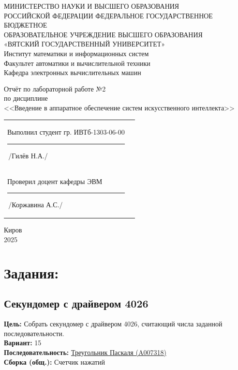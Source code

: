 \documentclass[oneside,a4paper,14pt]{extarticle} %
\begin{document}
\newpage\thispagestyle{empty}
\begin{center}
	МИНИСТЕРСТВО НАУКИ И ВЫСШЕГО ОБРАЗОВАНИЯ\\
	РОССИЙСКОЙ ФЕДЕРАЦИИ
	ФЕДЕРАЛЬНОЕ ГОСУДАРСТВЕННОЕ БЮДЖЕТНОЕ\\
	ОБРАЗОВАТЕЛЬНОЕ
	УЧРЕЖДЕНИЕ ВЫСШЕГО ОБРАЗОВАНИЯ\\
	«ВЯТСКИЙ ГОСУДАРСТВЕННЫЙ УНИВЕРСИТЕТ»\\
	Институт математики и информационных систем\\
	Факультет автоматики и вычислительной техники\\
	Кафедра электронных вычислительных машин
\end{center}
\vspace{30mm}

\begin{center}
	Отчёт по лабораторной работе №2\\
	по дисциплине\\
	<<Введение в аппаратное обеспечение систем искусственного интеллекта>>\\

\end{center}
\vspace{40mm}

\noindent
\begin{tabular}{l r}

	Выполнил студент гр. ИВТб-1303-06-00
	\hspace{15mm} \rule[-1mm]{30mm}{0.15mm}\,/Гилёв Н.А./ \\ %


	Проверил доцент кафедры ЭВМ \hfill
	\rule[-1mm]{30mm}{0.15mm}\,/Коржавина А.С./
\end{tabular}

\vfill
\begin{center}
	Киров\\
	2025
\end{center}



\newpage\thispagestyle{empty}


\section{Задания:}
    
    \subsection[short]{Секундомер с драйвером 4026}
    \textbf{Цель:} Собрать секундомер с драйвером 4026, считающий числа заданной последовательности.\\
    \textbf{Вариант:} 15\\
    \textbf{Последовательность:} \href{https://oeis.org/search?q=A007318&language=english&go=Search&authuser=0}{Треугольник Паскаля (A007318)}\\
    \textbf{Сборка (общ.):} Счетчик нажатий\\
      
\end{document}
